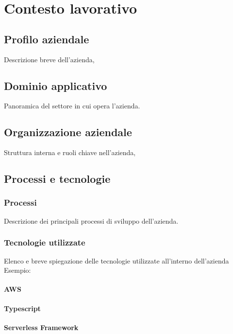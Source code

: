 
\chapter{Contesto lavorativo}
\label{cap:introduzione}
\section{Profilo aziendale}
Descrizione breve dell'azienda,

\section{Dominio applicativo}
Panoramica del settore in cui opera l'azienda.

\section{Organizzazione aziendale}
Struttura interna e ruoli chiave nell'azienda,

\section{Processi e tecnologie}
\subsection{Processi}
Descrizione dei principali processi di sviluppo dell'azienda.
\subsection{Tecnologie utilizzate}
Elenco e breve spiegazione delle tecnologie utilizzate all'interno dell'azienda
Esempio:
\subsubsection{AWS}
\subsubsection{Typescript}
\subsubsection{Serverless Framework}



